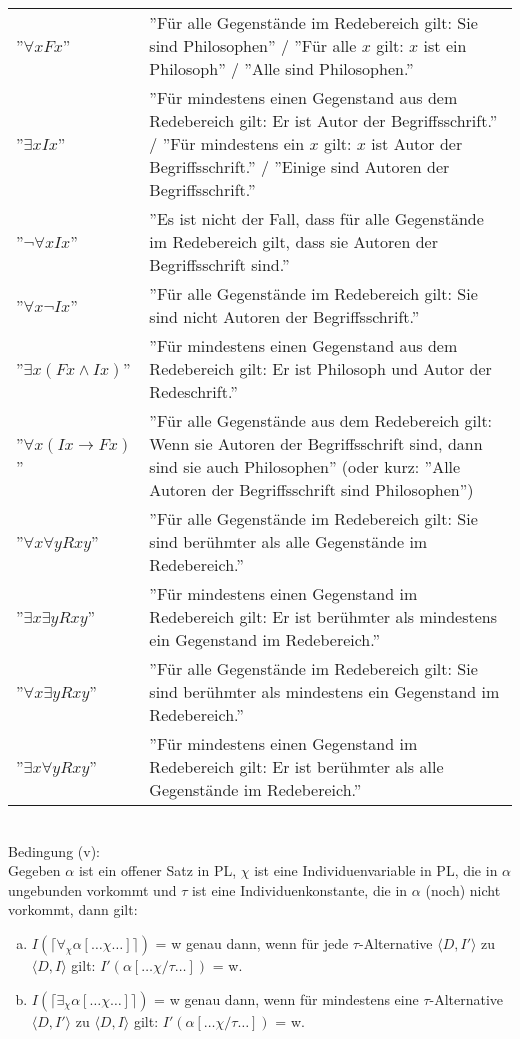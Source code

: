 \documentclass{scrartcl}
\begin{document}
\begin{tabularx}{\linewidth}{l X}
	''$ \forall x Fx $'' & ''Für alle Gegenstände im Redebereich gilt: Sie sind Philosophen'' / ''Für alle $ x $ gilt: $ x $ ist ein Philosoph'' / ''Alle sind Philosophen.'' \\
	''$ \exists x Ix $'' & ''Für mindestens einen Gegenstand aus dem Redebereich gilt: Er ist Autor der Begriffsschrift.'' / ''Für mindestens ein $ x $ gilt: $ x $ ist Autor der Begriffsschrift.'' / ''Einige sind Autoren der Begriffsschrift.'' \\
	''$ \neg \forall x Ix $'' & ''Es ist nicht der Fall, dass für alle Gegenstände im Redebereich gilt, dass sie Autoren der Begriffsschrift sind.'' \\
	''$ \forall x \neg Ix $'' & ''Für alle Gegenstände im Redebereich gilt: Sie sind nicht Autoren der Begriffsschrift.'' \\
	''$ \exists x (Fx \wedge Ix) $'' & ''Für mindestens einen Gegenstand aus dem Redebereich gilt: Er ist Philosoph und Autor der Redeschrift.'' \\
	''$ \forall x (Ix \rightarrow Fx) $'' & ''Für alle Gegenstände aus dem Redebereich gilt: Wenn sie Autoren der Begriffsschrift sind, dann sind sie auch Philosophen'' (oder kurz: ''Alle Autoren der Begriffsschrift sind Philosophen'') \\
	''$ \forall x \forall y Rxy $'' & ''Für alle Gegenstände im Redebereich gilt: Sie sind berühmter als alle Gegenstände im Redebereich.'' \\
	''$ \exists x \exists y Rxy $'' & ''Für mindestens einen Gegenstand im Redebereich gilt: Er ist berühmter als mindestens ein Gegenstand im Redebereich.'' \\
	''$ \forall x \exists y Rxy $'' & ''Für alle Gegenstände im Redebereich gilt: Sie sind berühmter als mindestens ein Gegenstand im Redebereich.'' \\
	''$ \exists x \forall y Rxy $'' & ''Für mindestens einen Gegenstand im Redebereich gilt: Er ist berühmter als alle Gegenstände im Redebereich.''
\end{tabularx} \\

Bedingung (v): \\
Gegeben $ \alpha $ ist ein offener Satz in PL, $ \chi $ ist eine Individuenvariable in PL, die in $ \alpha $ ungebunden vorkommt und $ \tau $ ist eine Individuenkonstante, die in $ \alpha $ (noch) nicht vorkommt, dann gilt:
\begin{enumerate}[(a)]
	\item $ I(\lceil \forall_\chi \alpha [\ldots \chi \ldots] \rceil) $ = w genau dann, wenn für jede $ \tau $-Alternative $ \langle D,I' \rangle $ zu $ \langle D,I \rangle $ gilt: $ I'(\alpha [\ldots \chi / \tau \ldots]) $ = w.
	\item $ I(\lceil \exists_\chi \alpha [\ldots \chi \ldots] \rceil) $ = w genau dann, wenn für mindestens eine $ \tau $-Alternative $ \langle D,I' \rangle $ zu $ \langle D,I \rangle $ gilt: $ I'(\alpha [\ldots \chi / \tau \ldots]) $ = w.
\end{enumerate}
\end{document}
